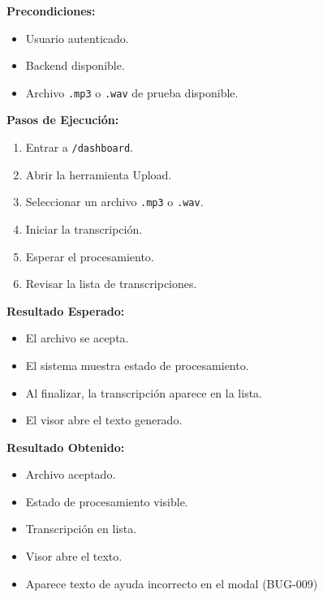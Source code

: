 \documentclass[12pt, a4paper]{article}
\newcommand{\prioChip}[2]{%
  \colorbox{#1}{\textcolor{white}{\footnotesize\textbf{#2}}}%
}
\newcommand{\statusChip}[2]{%
  \colorbox{#1}{\textcolor{white}{\footnotesize\textbf{#2}}}%
}
\begin{document}
\vspace{0.3cm}

\begin{tcolorbox}[enhanced, breakable, colback=white, colframe=espe-blue,
  boxrule=1pt, arc=5pt,
  title={\textbf{CP-05} \enspace Upload de audio para transcribir \hfill \prioChip{alta}{Alta} \enspace \statusChip{falla-red}{FALLADO}},
  fonttitle=\color{white},
  attach boxed title to top left={yshift=-2mm,xshift=4mm},
  boxed title style={colback=espe-blue,arc=3pt}]
\begin{minipage}[t]{0.48\linewidth}
\textbf{Precondiciones:}
\begin{itemize}[noitemsep,topsep=2pt]
  \item Usuario autenticado.
  \item Backend disponible.
  \item Archivo \texttt{.mp3} o \texttt{.wav} de prueba disponible.
\end{itemize}
\textbf{Pasos de Ejecuci\'on:}
\begin{enumerate}[noitemsep,topsep=2pt]
  \item Entrar a \texttt{/dashboard}.
  \item Abrir la herramienta Upload.
  \item Seleccionar un archivo \texttt{.mp3} o \texttt{.wav}.
  \item Iniciar la transcripci\'on.
  \item Esperar el procesamiento.
  \item Revisar la lista de transcripciones.
\end{enumerate}
\end{minipage}\hfill
\begin{minipage}[t]{0.48\linewidth}
\textbf{Resultado Esperado:}
\begin{itemize}[noitemsep,topsep=2pt]
  \item El archivo se acepta.
  \item El sistema muestra estado de procesamiento.
  \item Al finalizar, la transcripci\'on aparece en la lista.
  \item El visor abre el texto generado.
\end{itemize}
\vspace{4pt}
\textbf{Resultado Obtenido:}
\begin{itemize}[noitemsep,topsep=2pt]
  \item[$\checkmark$] Archivo aceptado.
  \item[$\checkmark$] Estado de procesamiento visible.
  \item[$\checkmark$] Transcripci\'on en lista.
  \item[$\checkmark$] Visor abre el texto.
  \item[$\times$] Aparece texto de ayuda incorrecto en el modal (BUG-009)
\end{itemize}
\end{minipage}
\end{tcolorbox}
\end{document}

